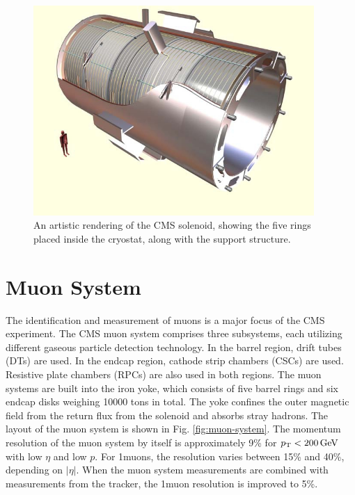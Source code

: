 \documentclass[12pt]{thesis}  %
\begin{document}
\begin{figure}[hbt]
\begin{center}
\includegraphics[width=0.95\textwidth]{figures/CMS_solenoid.jpg}
\caption{An artistic rendering of the CMS solenoid, showing the five rings placed inside the cryostat, along with the support structure.}
\label{fig:solenoid}
\end{center}
\end{figure}

\section{Muon System}
\label{sec:muon-system}

The identification and measurement of muons is a major focus of the CMS experiment. The CMS muon system comprises three subsystems, each utilizing different gaseous particle detection technology. In the barrel region, drift tubes (DTs) are used. In the endcap region, cathode strip chambers (CSCs) are used. Resistive plate chambers (RPCs) are also used in both regions. The muon systems are built into the iron yoke, which consists of five barrel rings and six endcap disks weighing 10000 tons in total. The yoke confines the outer magnetic field from the return flux from the solenoid and absorbs stray hadrons. The layout of the muon system is shown in Fig. \ref{fig:muon-system}. The momentum resolution of the muon system by itself is approximately 9\% for $p_{\mathrm{T}}<200\,\text{Ge\hspace{-.08em}V}$ with low $\eta$ and low $p$. For 1\TeV muons, the resolution varies between 15\% and 40\%, depending on $|\eta|$. When the muon system measurements are combined with measurements from the tracker, the 1\TeV muon resolution is improved to 5\%.
\end{document}
